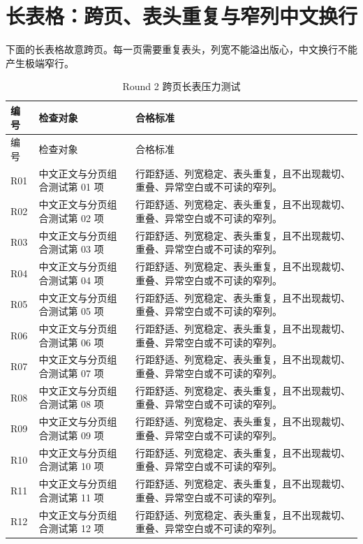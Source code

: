 \section{长表格：跨页、表头重复与窄列中文换行}
下面的长表格故意跨页。每一页需要重复表头，列宽不能溢出版心，中文换行不能产生极端窄行。
\small
\begin{longtable}{@{}p{.13\linewidth}p{.36\linewidth}p{.39\linewidth}@{}}
\caption{Round 2 跨页长表压力测试}\label{tab:stress}\\
\toprule
编号 & 检查对象 & 合格标准 \\
\midrule
\endfirsthead
\toprule 编号 & 检查对象 & 合格标准 \\
\midrule
\endhead
\bottomrule
\endfoot
R01 & 中文正文与分页组合测试第 01 项 & 行距舒适、列宽稳定、表头重复，且不出现裁切、重叠、异常空白或不可读的窄列。\\
R02 & 中文正文与分页组合测试第 02 项 & 行距舒适、列宽稳定、表头重复，且不出现裁切、重叠、异常空白或不可读的窄列。\\
R03 & 中文正文与分页组合测试第 03 项 & 行距舒适、列宽稳定、表头重复，且不出现裁切、重叠、异常空白或不可读的窄列。\\
R04 & 中文正文与分页组合测试第 04 项 & 行距舒适、列宽稳定、表头重复，且不出现裁切、重叠、异常空白或不可读的窄列。\\
R05 & 中文正文与分页组合测试第 05 项 & 行距舒适、列宽稳定、表头重复，且不出现裁切、重叠、异常空白或不可读的窄列。\\
R06 & 中文正文与分页组合测试第 06 项 & 行距舒适、列宽稳定、表头重复，且不出现裁切、重叠、异常空白或不可读的窄列。\\
R07 & 中文正文与分页组合测试第 07 项 & 行距舒适、列宽稳定、表头重复，且不出现裁切、重叠、异常空白或不可读的窄列。\\
R08 & 中文正文与分页组合测试第 08 项 & 行距舒适、列宽稳定、表头重复，且不出现裁切、重叠、异常空白或不可读的窄列。\\
R09 & 中文正文与分页组合测试第 09 项 & 行距舒适、列宽稳定、表头重复，且不出现裁切、重叠、异常空白或不可读的窄列。\\
R10 & 中文正文与分页组合测试第 10 项 & 行距舒适、列宽稳定、表头重复，且不出现裁切、重叠、异常空白或不可读的窄列。\\
R11 & 中文正文与分页组合测试第 11 项 & 行距舒适、列宽稳定、表头重复，且不出现裁切、重叠、异常空白或不可读的窄列。\\
R12 & 中文正文与分页组合测试第 12 项 & 行距舒适、列宽稳定、表头重复，且不出现裁切、重叠、异常空白或不可读的窄列。\\

\end{longtable}
